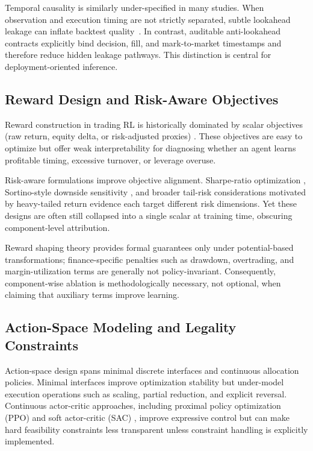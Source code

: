Temporal causality is similarly under-specified in many studies. When observation and execution timing are not strictly separated, subtle lookahead leakage can inflate backtest quality~\citep{zhang2020deep}. In contrast, auditable anti-lookahead contracts explicitly bind decision, fill, and mark-to-market timestamps and therefore reduce hidden leakage pathways. This distinction is central for deployment-oriented inference.

\subsection{Reward Design and Risk-Aware Objectives}
Reward construction in trading RL is historically dominated by scalar objectives (raw return, equity delta, or risk-adjusted proxies) \citep{meng2019reinforcement,theate2021application}. These objectives are easy to optimize but offer weak interpretability for diagnosing whether an agent learns profitable timing, excessive turnover, or leverage overuse.

Risk-aware formulations improve objective alignment. Sharpe-ratio optimization \citep{moody2001learning,sharpe1994sharpe}, Sortino-style downside sensitivity \citep{sortino1994performance}, and broader tail-risk considerations motivated by heavy-tailed return evidence \citep{cont2001empirical} each target different risk dimensions. Yet these designs are often still collapsed into a single scalar at training time, obscuring component-level attribution.

Reward shaping theory \citep{ng1999policy} provides formal guarantees only under potential-based transformations; finance-specific penalties such as drawdown, overtrading, and margin-utilization terms are generally not policy-invariant. Consequently, component-wise ablation is methodologically necessary, not optional, when claiming that auxiliary terms improve learning.

\subsection{Action-Space Modeling and Legality Constraints}
Action-space design spans minimal discrete interfaces and continuous allocation policies. Minimal interfaces improve optimization stability but under-model execution operations such as scaling, partial reduction, and explicit reversal. Continuous actor-critic approaches, including proximal policy optimization (PPO) \citep{schulman2017proximal} and soft actor-critic (SAC) \citep{haarnoja2018soft}, improve expressive control but can make hard feasibility constraints less transparent unless constraint handling is explicitly implemented.

